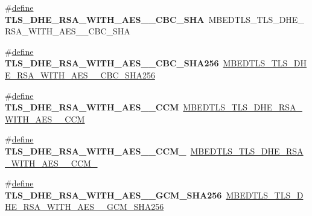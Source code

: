 \begin{DoxyCompactItemize}
\item 
\mbox{\label{compat-1_83_8h_aab1a72487e5a66ec94a42eb8e88a09f7}} 
\#\hyperlink{structdefine}{define} {\bfseries T\+L\+S\+\_\+\+D\+H\+E\+\_\+\+R\+S\+A\+\_\+\+W\+I\+T\+H\+\_\+\+A\+E\+S\+\_\+\_\+\+C\+B\+C\+\_\+\+S\+HA}~M\+B\+E\+D\+T\+L\+S\+\_\+\+T\+L\+S\+\_\+\+D\+H\+E\+\_\+\+R\+S\+A\+\_\+\+W\+I\+T\+H\+\_\+\+A\+E\+S\+\_\+\_\+\+C\+B\+C\+\_\+\+S\+HA
\item 
\mbox{\label{compat-1_83_8h_a7a57810f4fe1339ae63ca4771661ad04}} 
\#\hyperlink{structdefine}{define} {\bfseries T\+L\+S\+\_\+\+D\+H\+E\+\_\+\+R\+S\+A\+\_\+\+W\+I\+T\+H\+\_\+\+A\+E\+S\+\_\+\_\+\+C\+B\+C\+\_\+\+S\+H\+A256}~\hyperlink{ssl__ciphersuites_8h_af907f21f9472157e01484c8d1035d675}{M\+B\+E\+D\+T\+L\+S\+\_\+\+T\+L\+S\+\_\+\+D\+H\+E\+\_\+\+R\+S\+A\+\_\+\+W\+I\+T\+H\+\_\+\+A\+E\+S\+\_\+\_\+\+C\+B\+C\+\_\+\+S\+H\+A256}
\item 
\mbox{\label{compat-1_83_8h_a6c93ed48205031a19333788624a47b01}} 
\#\hyperlink{structdefine}{define} {\bfseries T\+L\+S\+\_\+\+D\+H\+E\+\_\+\+R\+S\+A\+\_\+\+W\+I\+T\+H\+\_\+\+A\+E\+S\+\_\+\_\+\+C\+CM}~\hyperlink{ssl__ciphersuites_8h_a822d364e10b957f50417ba405cfa287c}{M\+B\+E\+D\+T\+L\+S\+\_\+\+T\+L\+S\+\_\+\+D\+H\+E\+\_\+\+R\+S\+A\+\_\+\+W\+I\+T\+H\+\_\+\+A\+E\+S\+\_\+\_\+\+C\+CM}
\item 
\mbox{\label{compat-1_83_8h_ac18f8b5ce841e70e80c0f57250c44863}} 
\#\hyperlink{structdefine}{define} {\bfseries T\+L\+S\+\_\+\+D\+H\+E\+\_\+\+R\+S\+A\+\_\+\+W\+I\+T\+H\+\_\+\+A\+E\+S\+\_\+\_\+\+C\+C\+M\+\_}~\hyperlink{ssl__ciphersuites_8h_a0ad8cceec914f058c041251bdbf17bf1}{M\+B\+E\+D\+T\+L\+S\+\_\+\+T\+L\+S\+\_\+\+D\+H\+E\+\_\+\+R\+S\+A\+\_\+\+W\+I\+T\+H\+\_\+\+A\+E\+S\+\_\+\_\+\+C\+C\+M\+\_}
\item 
\mbox{\label{compat-1_83_8h_a3dc8b4ef99deb86586540f85e9c65d01}} 
\#\hyperlink{structdefine}{define} {\bfseries T\+L\+S\+\_\+\+D\+H\+E\+\_\+\+R\+S\+A\+\_\+\+W\+I\+T\+H\+\_\+\+A\+E\+S\+\_\+\_\+\+G\+C\+M\+\_\+\+S\+H\+A256}~\hyperlink{ssl__ciphersuites_8h_aaeb52cd4251f8ea0b75808697cece263}{M\+B\+E\+D\+T\+L\+S\+\_\+\+T\+L\+S\+\_\+\+D\+H\+E\+\_\+\+R\+S\+A\+\_\+\+W\+I\+T\+H\+\_\+\+A\+E\+S\+\_\+\_\+\+G\+C\+M\+\_\+\+S\+H\+A256}
\item 

\end{DoxyCompactItemize}
